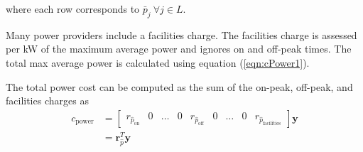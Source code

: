 where each row corresponds to $\bar{p}_j \ \forall j \in L$.
\par Many power providers include a facilities charge.  The facilities
charge is assessed per kW of the maximum average power and ignores on
and off-peak times. The total max average power is calculated using equation (\ref{eqn:cPower1}).
\par The total power cost can be computed as the sum of the on-peak, off-peak, and facilities charges as 
\begin{equation}
	\begin{aligned}
		c_\text{power} &= \begin{bmatrix}r_{\hat{p}_{\text{on}}}&0 & \hdots & 0 & r_{\hat{p}_{\text{off}}} & 0& \hdots &0& r_{\hat{p}_{\text{facilities}}} \end{bmatrix}\mathbf{y} \\
			&= \mathbf{r}_{\hat{p}}^T\mathbf{y}
	\end{aligned}
\end{equation}

